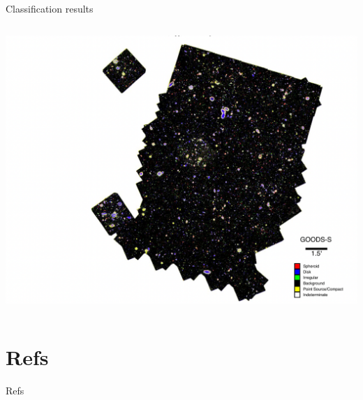 \documentclass[aspectratio=1610,xcolor={dvipsnames},hyperref={colorlinks,unicode,linkcolor=violet,anchorcolor=blueviolet,citecolor=YellowOrange,filecolor=black,urlcolor=Aquamarine}]{beamer}
\begin{document}
\begin{frame}[label={sec:orge5644a2}]{Classification results}
\begin{columns}
\begin{column}{0.5\textwidth}
\begin{center}
\includegraphics[width=.9\linewidth]{./p13.png}
\end{center}

\end{column}
\end{columns}
\end{frame}

\section{Refs}
\label{sec:orga25ba6e}

\begin{frame}[allowframebreaks]{Refs}
\printbibliography
\end{frame}
\end{document}
